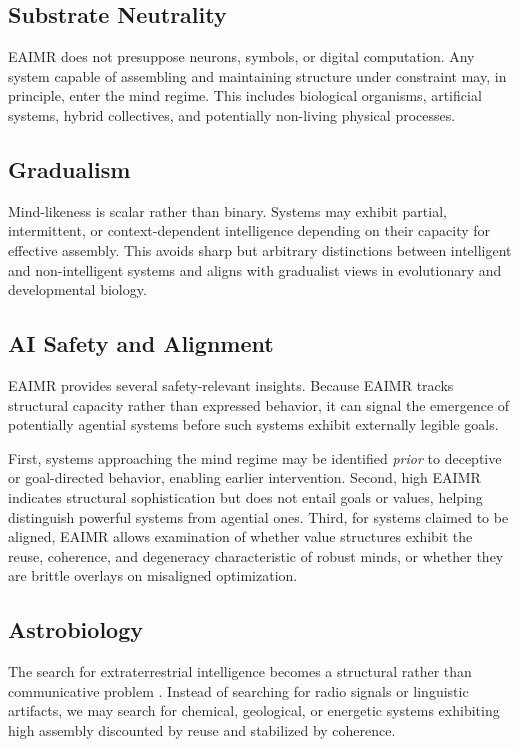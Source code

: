 \documentclass[11pt,letterpaper]{article}
\begin{document}
\subsection{Substrate Neutrality}

EAIMR does not presuppose neurons, symbols, or digital computation. Any system capable of assembling and maintaining structure under constraint may, in principle, enter the mind regime. This includes biological organisms, artificial systems, hybrid collectives, and potentially non-living physical processes.

\subsection{Gradualism}

Mind-likeness is scalar rather than binary. Systems may exhibit partial, intermittent, or context-dependent intelligence depending on their capacity for effective assembly. This avoids sharp but arbitrary distinctions between intelligent and non-intelligent systems and aligns with gradualist views in evolutionary and developmental biology.

\subsection{AI Safety and Alignment}

EAIMR provides several safety-relevant insights. Because EAIMR tracks structural capacity rather than expressed behavior, it can signal the emergence of potentially agential systems before such systems exhibit externally legible goals.

First, systems approaching the mind regime may be identified \emph{prior} to deceptive or goal-directed behavior, enabling earlier intervention. Second, high EAIMR indicates structural sophistication but does not entail goals or values, helping distinguish powerful systems from agential ones. Third, for systems claimed to be aligned, EAIMR allows examination of whether value structures exhibit the reuse, coherence, and degeneracy characteristic of robust minds, or whether they are brittle overlays on misaligned optimization.

\subsection{Astrobiology}

The search for extraterrestrial intelligence becomes a structural rather than communicative problem \parencite{walker2022}. Instead of searching for radio signals or linguistic artifacts, we may search for chemical, geological, or energetic systems exhibiting high assembly discounted by reuse and stabilized by coherence.
\end{document}

